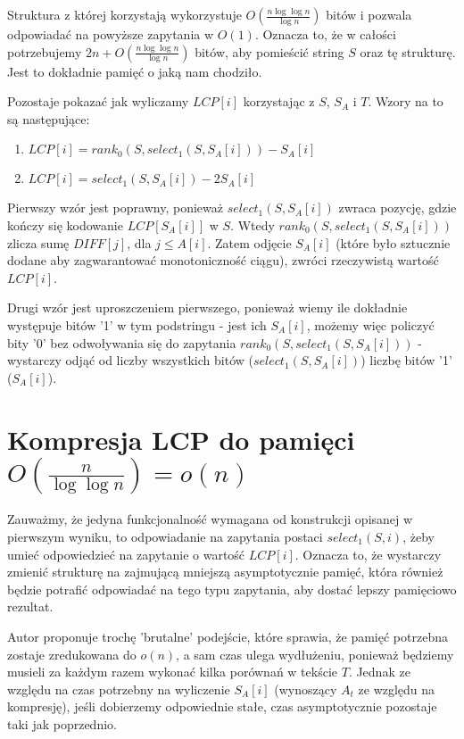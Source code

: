 \documentclass{article}
\begin{document}
Struktura z której korzystają wykorzystuje $O(\frac{n \log{\log{n}}}{\log{n}})$ bitów i pozwala odpowiadać na powyższe zapytania w $O(1)$. Oznacza to, że w całości potrzebujemy $2n + O(\frac{n \log{\log{n}}}{\log{n}})$ bitów, aby pomieścić string $S$ oraz tę strukturę. Jest to dokładnie pamięć o jaką nam chodziło.

Pozostaje pokazać jak wyliczamy $LCP[i]$ korzystając z $S$, $S_A$ i $T$. Wzory na to są następujące:

\begin{enumerate}
    \item $LCP[i] = rank_0(S, select_1(S, S_A[i])) - S_A[i]$
    \item $LCP[i] = select_1(S, S_A[i]) - 2S_A[i]$
\end{enumerate}

Pierwszy wzór jest poprawny, ponieważ $select_1(S, S_A[i])$ zwraca pozycję, gdzie kończy się kodowanie $LCP[S_A[i]]$ w $S$. Wtedy $rank_0(S, select_1(S, S_A[i]))$ zlicza sumę $DIFF[j]$, dla $j \le A[i]$. Zatem odjęcie $S_A[i]$ (które było sztucznie dodane aby zagwarantować monotoniczność ciągu), zwróci rzeczywistą wartość $LCP[i]$.

Drugi wzór jest uproszczeniem pierwszego, ponieważ wiemy ile dokładnie występuje bitów '1' w tym podstringu - jest ich $S_A[i]$, możemy więc policzyć bity '0' bez odwoływania się do zapytania $rank_0(S, select_1(S, S_A[i]))$ - wystarczy odjąć od liczby wszystkich bitów ($select_1(S, S_A[i])$) liczbę bitów '1' ($S_A[i]$).

\section{Kompresja LCP do pamięci $O(\frac{n}{\log{\log{n}}}) = o(n)$}

Zauważmy, że jedyna funkcjonalność wymagana od konstrukcji opisanej w pierwszym wyniku, to odpowiadanie na zapytania postaci $select_1(S, i)$, żeby umieć odpowiedzieć na zapytanie o wartość $LCP[i]$. Oznacza to, że wystarczy zmienić strukturę na zajmującą mniejszą asymptotycznie pamięć, która również będzie potrafić odpowiadać na tego typu zapytania, aby dostać lepszy pamięciowo rezultat.

Autor proponuje trochę 'brutalne' podejście, które sprawia, że pamięć potrzebna zostaje zredukowana do $o(n)$, a sam czas ulega wydłużeniu, ponieważ będziemy musieli za każdym razem wykonać kilka porównań w tekście $T$. Jednak ze względu na czas potrzebny na wyliczenie $S_A[i]$ (wynoszący $A_t$ ze względu na kompresję), jeśli dobierzemy odpowiednie stałe, czas asymptotycznie pozostaje taki jak poprzednio.
\end{document}
